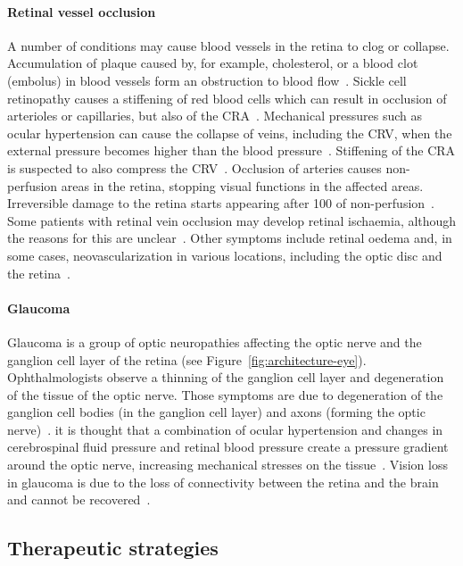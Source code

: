 \documentclass{article}
\begin{document}
\paragraph*{Retinal vessel occlusion}
A number of conditions may cause blood vessels in the retina to clog or collapse.
Accumulation of plaque caused by, for example, cholesterol, or a blood clot (embolus) in blood vessels form an obstruction to blood flow~\cite{Medina_2016}.
Sickle cell retinopathy causes a stiffening of red blood cells which can result in occlusion of arterioles or capillaries, but also of the CRA~\cite{Medina_2016}.
Mechanical pressures such as ocular hypertension can cause the collapse of veins, including the CRV, when the external pressure becomes higher than the blood pressure~\cite{Hayreh_2004}.
Stiffening of the CRA is suspected to also compress the CRV~\cite{Medina_2016}.
Occlusion of arteries causes non-perfusion areas in the retina, stopping visual functions in the affected areas.
Irreversible damage to the retina starts appearing after \SI{100}{\min} of non-perfusion~\cite{Hayreh_2004}.
Some patients with retinal vein occlusion may develop retinal ischaemia, although the reasons for this are unclear~\cite{Khayat_2018}.
Other symptoms include retinal oedema and, in some cases, neovascularization in various locations, including the optic disc and the retina~\cite{Medina_2016}.
\\

\paragraph*{Glaucoma}
Glaucoma is a group of optic neuropathies affecting the optic nerve and the ganglion cell layer of the retina (see Figure~\ref{fig:architecture-eye}).
Ophthalmologists observe a thinning of the ganglion cell layer and degeneration of the tissue of the optic nerve.
Those symptoms are due to degeneration of the ganglion cell bodies (in the ganglion cell layer) and axons (forming the optic nerve)~\cite{Quigley_2011}.
it is thought that a combination of ocular hypertension and changes in cerebrospinal fluid pressure and retinal blood pressure create a pressure gradient around the optic nerve, increasing mechanical stresses on the tissue~\cite{Band_2009,Nickells_2012}.
Vision loss in glaucoma is due to the loss of connectivity between the retina and the brain and cannot be recovered~\cite{Quigley_2011}.


\subsection{Therapeutic strategies}
\end{document}
